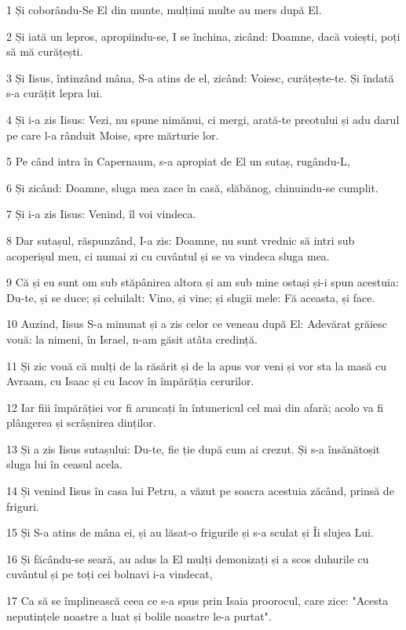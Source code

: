 \par 1 Și coborându-Se El din munte, mulțimi multe au mers după El.
\par 2 Și iată un lepros, apropiindu-se, I se închina, zicând: Doamne, dacă voiești, poți să mă curățești.
\par 3 Și Iisus, întinzând mâna, S-a atins de el, zicând: Voiesc, curățește-te. Și îndată s-a curățit lepra lui.
\par 4 Și i-a zis Iisus: Vezi, nu spune nimănui, ci mergi, arată-te preotului și adu darul pe care l-a rânduit Moise, spre mărturie lor.
\par 5 Pe când intra în Capernaum, s-a apropiat de El un sutaș, rugându-L,
\par 6 Și zicând: Doamne, sluga mea zace în casă, slăbănog, chinuindu-se cumplit.
\par 7 Și i-a zis Iisus: Venind, îl voi vindeca.
\par 8 Dar sutașul, răspunzând, I-a zis: Doamne, nu sunt vrednic să intri sub acoperișul meu, ci numai zi cu cuvântul și se va vindeca sluga mea.
\par 9 Că și eu sunt om sub stăpânirea altora și am sub mine ostași și-i spun acestuia: Du-te, și se duce; și celuilalt: Vino, și vine; și slugii mele: Fă aceasta, și face.
\par 10 Auzind, Iisus S-a minunat și a zis celor ce veneau după El: Adevărat grăiesc vouă: la nimeni, în Israel, n-am găsit atâta credință.
\par 11 Și zic vouă că mulți de la răsărit și de la apus vor veni și vor sta la masă cu Avraam, cu Isaac și cu Iacov în împărăția cerurilor.
\par 12 Iar fiii împărăției vor fi aruncați în întunericul cel mai din afară; acolo va fi plângerea și scrâșnirea dinților.
\par 13 Și a zis Iisus sutașului: Du-te, fie ție după cum ai crezut. Și s-a însănătoșit sluga lui în ceasul acela.
\par 14 Și venind Iisus în casa lui Petru, a văzut pe soacra acestuia zăcând, prinsă de friguri.
\par 15 Și S-a atins de mâna ei, și au lăsat-o frigurile și s-a sculat și Îi slujea Lui.
\par 16 Și făcându-se seară, au adus la El mulți demonizați și a scos duhurile cu cuvântul și pe toți cei bolnavi i-a vindecat,
\par 17 Ca să se împlinească ceea ce s-a spus prin Isaia proorocul, care zice: "Acesta neputințele noastre a luat și bolile noastre le-a purtat".
